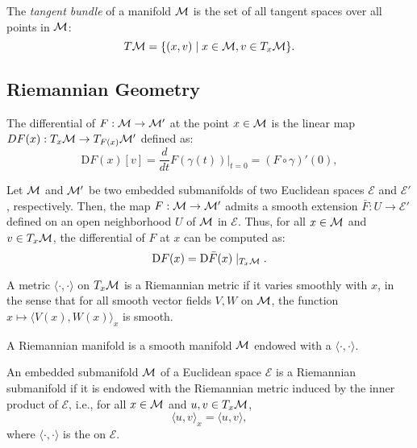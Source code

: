 \begin{definition}
    The \emph{tangent bundle} of a manifold $\mathcal{M}$ is the set of all tangent spaces over all points in $\mathcal{M}$:
    \[
        T\mathcal{M} = \{ (x,v) \mid x \in \mathcal{M}, v \in T_x \mathcal{M} \}.
    \]
\end{definition}

\subsection{Riemannian Geometry}
\begin{definition}[Differential]
    The differential of $F: \mathcal{M} \to \mathcal{M}'$ at the point $x \in \mathcal{M}$ is the linear map $DF(x) : T_x \mathcal{M} \to T_{F(x)} \mathcal{M}'$ defined as:
    \[
        \textrm{D}F(x)[v] = \frac{d}{dt} F(\gamma(t)) \Big|_{t = 0} = (F \circ \gamma)'(0),
    \]
    
    Let $\mathcal{M}$ and $\mathcal{M}'$ be two embedded submanifolds of two Euclidean spaces $\mathcal{E}$ and $\mathcal{E}'$, respectively. Then, the map $F : \mathcal{M} \to \mathcal{M}'$ admits a smooth extension $\bar{F} : U \to \mathcal{E}'$ defined on an open neighborhood $U$ of $\mathcal{M}$ in $\mathcal{E}$. Thus, for all $x \in \mathcal{M}$ and $v \in T_x \mathcal{M}$, the differential of $F$ at $x$ can be computed as:
    \[
        \textrm{D}F(x) = \textrm{D}\bar{F}(x) \mid_{T_x \mathcal{M}}.
    \]
\end{definition}

\begin{definition} \label{def:riem-metric}
    A metric $\langle \cdot, \cdot \rangle$ on $T_x \mathcal{M}$ is a Riemannian metric if it varies smoothly with $x$, in the sense that for all smooth vector fields $V,W$ on $\mathcal{M}$, the function $x \mapsto \langle V(x), W(x) \rangle_x$ is smooth.
\end{definition}

\begin{definition} \label{def:riem-manifold}
    A Riemannian manifold is a smooth manifold $\mathcal{M}$ endowed with a  $\langle \cdot, \cdot \rangle$.
    
\end{definition}

\begin{definition}
    An embedded submanifold $\mathcal{M}$ of a Euclidean space $\mathcal{E}$ is a Riemannian submanifold if it is endowed with the Riemannian metric induced by the inner product of $\mathcal{E}$, i.e., for all $x \in \mathcal{M}$ and $u,v \in T_x \mathcal{M}$,
    \[
        \langle u, v \rangle_x = \langle u, v \rangle,
    \]
    where $\langle \cdot, \cdot \rangle$ is the  on $\mathcal{E}$.
    
\end{definition}

